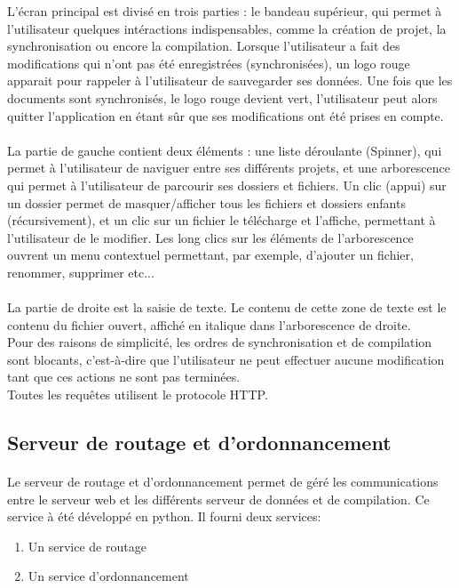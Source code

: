 \documentclass[a4paper,12pt]{article}
\begin{document}
L'écran principal est divisé en trois parties : le bandeau supérieur, qui permet à l'utilisateur quelques intéractions indispensables, comme la création de projet, la synchronisation ou encore la compilation. Lorsque l'utilisateur a fait des modifications qui 
n'ont pas été enregistrées (synchronisées), un logo rouge apparait pour rappeler à l'utilisateur de sauvegarder ses données. Une fois que les documents sont synchronisés, le logo rouge devient vert, l'utilisateur peut alors quitter l'application en étant sûr que ses 
modifications ont été prises en compte.\\
\paragraph*{}
La partie de gauche contient deux éléments : une liste déroulante (Spinner), qui permet à l'utilisateur de naviguer entre ses différents projets, et une arborescence qui permet à l'utilisateur de parcourir ses dossiers et fichiers. Un clic (appui) sur un dossier 
permet de masquer/afficher tous les fichiers et dossiers enfants (récursivement), et un clic sur un fichier le télécharge et l'affiche, permettant à l'utilisateur de le modifier. Les long clics sur les éléments de l'arborescence ouvrent un menu contextuel permettant, 
par exemple, d'ajouter un fichier, renommer, supprimer etc...\\
\paragraph*{}
La partie de droite est la saisie de texte. Le contenu de cette zone de texte est le contenu du fichier ouvert, affiché en italique dans l'arborescence de droite.\\

Pour des raisons de simplicité, les ordres de synchronisation et de compilation sont blocants, c'est-à-dire que l'utilisateur ne peut effectuer aucune modification tant que ces actions ne sont pas terminées.\\ 
Toutes les requêtes utilisent le protocole HTTP.


\subsection{Serveur de routage et d'ordonnancement}
\paragraph*{}
Le serveur de routage et d'ordonnancement permet de géré les communications entre le serveur web et les différents serveur de données et de compilation. Ce service à été développé en python. Il fourni deux services:
\begin{enumerate}
 \item Un service de routage
 \item Un service d'ordonnancement
\end{enumerate}
\end{document}
